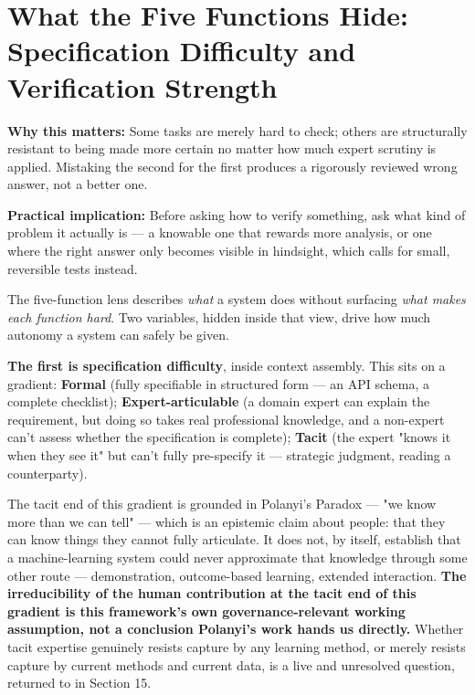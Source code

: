 \section{What the Five Functions Hide: Specification Difficulty and Verification Strength}

\textbf{Why this matters:} Some tasks are merely hard to check; others are structurally resistant to being made more certain no matter how much expert scrutiny is applied. Mistaking the second for the first produces a rigorously reviewed wrong answer, not a better one.

\textbf{Practical implication:} Before asking how to verify something, ask what kind of problem it actually is --- a knowable one that rewards more analysis, or one where the right answer only becomes visible in hindsight, which calls for small, reversible tests instead.

The five-function lens describes \emph{what} a system does without surfacing \emph{what makes each function hard}. Two variables, hidden inside that view, drive how much autonomy a system can safely be given.

\textbf{The first is specification difficulty}, inside context assembly. This sits on a gradient: \textbf{Formal} (fully specifiable in structured form --- an API schema, a complete checklist); \textbf{Expert-articulable} (a domain expert can explain the requirement, but doing so takes real professional knowledge, and a non-expert can't assess whether the specification is complete); \textbf{Tacit} (the expert "knows it when they see it" but can't fully pre-specify it --- strategic judgment, reading a counterparty).

The tacit end of this gradient is grounded in Polanyi's Paradox --- "we know more than we can tell" --- which is an epistemic claim about people: that they can know things they cannot fully articulate. It does not, by itself, establish that a machine-learning system could never approximate that knowledge through some other route --- demonstration, outcome-based learning, extended interaction. \textbf{The irreducibility of the human contribution at the tacit end of this gradient is this framework's own governance-relevant working assumption, not a conclusion Polanyi's work hands us directly.} Whether tacit expertise genuinely resists capture by any learning method, or merely resists capture by current methods and current data, is a live and unresolved question, returned to in Section 15.

